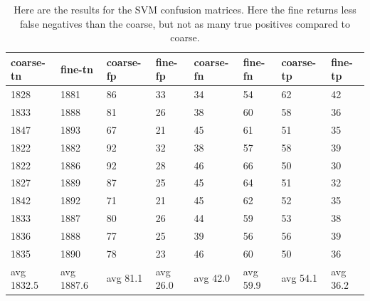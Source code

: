 \documentclass[ms]{nuthesis}
\begin{document}
\FloatBarrier
\begin{table}[h]
  \centering
  \begin{tabular}{|l||l||l||l||l||l||l||l|}\toprule
    coarse-tn & fine-tn & coarse-fp & fine-fp & coarse-fn & fine-fn & coarse-tp & fine-tp \\ \midrule
    1828 & 1881 & 86 & 33 & 34 & 54 & 62 & 42 \\
    1833 & 1888 & 81 & 26 & 38 & 60 & 58 & 36 \\
    1847 & 1893 & 67 & 21 & 45 & 61 & 51 & 35 \\
    1822 & 1882 & 92 & 32 & 38 & 57 & 58 & 39 \\
    1822 & 1886 & 92 & 28 & 46 & 66 & 50 & 30 \\
    1827 & 1889 & 87 & 25 & 45 & 64 & 51 & 32 \\
    1842 & 1892 & 71 & 21 & 45 & 62 & 52 & 35 \\
    1833 & 1887 & 80 & 26 & 44 & 59 & 53 & 38 \\
    1836 & 1888 & 77 & 25 & 39 & 56 & 56 & 39 \\
    1835 & 1890 & 78 & 23 & 46 & 60 & 50 & 36 \\
    avg 1832.5 & avg 1887.6 & avg 81.1 & avg 26.0 & avg 42.0 & avg 59.9 & avg 54.1 & avg 36.2 \\ \bottomrule
  \end{tabular}
  \caption{Here are the results for the SVM confusion matrices. Here the fine returns less false negatives
  than the coarse, but not as many true positives compared to coarse.}
  \label{tab:SVM}
\end{table}
\FloatBarrier
\end{document}
